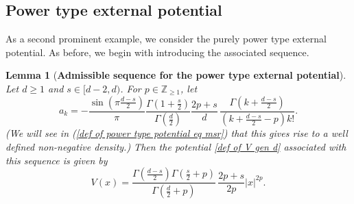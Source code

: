 \documentclass[10pt]{amsart}
\theoremstyle{plain}
\newtheorem{lem}[thm]{Lemma}
\theoremstyle{remark}
\numberwithin{equation}{section}
\begin{document}
 




 











































 



 







\subsection{Power type external potential}\label{S1.3}

As a second prominent example, we consider the purely power type external potential. As before, we begin with introducing the associated sequence. 


\begin{lem}[\textbf{Admissible sequence for the power type external potential}] \label{Lem_ak for power type potential}
Let $d \ge 1$ and $s \in [d-2,d)$. For $p\in \mathbb{Z}_{ \ge 1 }$, let 
\begin{equation} \label{def of ak for power type potential}
a_k= - \frac{ \sin(\pi \frac{d-s}{2})  }{\pi} \frac{\Gamma(1+\frac{s}{2})}{ \Gamma( \frac{d}{2} ) } \frac{2p+s}{d}\, \frac{ \Gamma(k+\frac{d-s}{2}) }{ (k+\frac{d-s}{2}-p)k! } . 
\end{equation}
(We will see in (\ref{def of power type potential eq msr}) that this gives rise to a well defined non-negative density.)
Then the potential \eqref{def of V gen d} associated with this sequence is given by \begin{equation} \label{def of V for power type}
V(x) =    \frac{ \Gamma(\frac{d-s}{2})\Gamma(\frac{s}{2}+p)   }{ \Gamma(\frac{d}{2}+p)  } \, \frac{2p+s}{ 2p  }       |x|^{2p} . 
\end{equation}
\end{lem}
\end{document}
